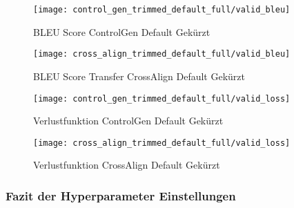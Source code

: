 \begin{figure}[H]
    \texttt{[image: control\_gen\_trimmed\_default\_full/valid\_bleu]}
    \caption{BLEU Score ControlGen Default \flqq Gekürzt\frqq}\label{fig:control_gen_trimmed_default_full_valid_bleu}
  \endminipage\hfill
    \texttt{[image: cross\_align\_trimmed\_default\_full/valid\_bleu]}
    \caption{BLEU Score Transfer CrossAlign Default \flqq Gekürzt\frqq}\label{fig:cross_align_trimmed_default_full_valid_bleu}
  \endminipage\hfill   
\end{figure}

\begin{figure}[H]
    \texttt{[image: control\_gen\_trimmed\_default\_full/valid\_loss]}
    \caption{Verlustfunktion ControlGen Default \flqq Gekürzt\frqq}\label{fig:control_gen_trimmed_default_full_valid_loss}
  \endminipage\hfill
    \texttt{[image: cross\_align\_trimmed\_default\_full/valid\_loss]}
    \caption{Verlustfunktion CrossAlign Default \flqq Gekürzt\frqq}\label{fig:cross_align_trimmed_default_full_valid_loss}
  \endminipage\hfill   
\end{figure}

\subsubsection{Fazit der Hyperparameter Einstellungen}

